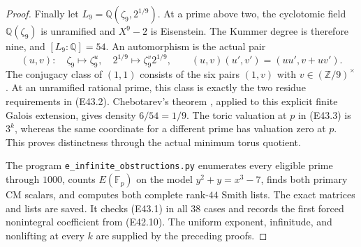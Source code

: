 \begin{proof}
Finally let $L_9=\mathbb Q(\zeta_9,2^{1/9})$.
At a prime above two, the cyclotomic field
$\mathbb Q(\zeta_9)$ is unramified and
$X^9-2$ is Eisenstein. The Kummer degree is
therefore nine, and $[L_9:\mathbb Q]=54$.
An automorphism is the actual pair
\[
 (u,v):\quad\zeta_9\mapsto\zeta_9^u,
       \quad2^{1/9}\mapsto\zeta_9^v2^{1/9},
 \qquad (u,v)(u',v')=(uu',v+uv').
\]
The conjugacy class of $(1,1)$ consists of
the six pairs $(1,v)$ with $v\in(\mathbb Z/9)^\times$.
At an unramified rational prime, this class
is exactly the two residue requirements in
(E43.2). Chebotarev's theorem
\cite[V, Theorem 3.23]{E_MilneCFT}, applied to
this explicit finite Galois extension, gives
density $6/54=1/9$.
The toric valuation at $p$ in (E43.3) is
$3^k$, whereas the same coordinate for a
different prime has valuation zero at $p$.
This proves distinctness through the actual
minimum torus quotient.

The program \texttt{e\_infinite\_obstructions.py}
enumerates every eligible prime through $1000$,
counts $E(\mathbb F_p)$ on the model
$y^2+y=x^3-7$, finds both primary CM scalars,
and computes both complete rank-$44$ Smith
lists. The exact matrices and lists are saved.
It checks (E43.1) in all $38$ cases and records
the first forced nonintegral coefficient from
(E42.10). The uniform exponent, infinitude,
and nonlifting at every $k$ are supplied by
the preceding proofs.
\end{proof}

